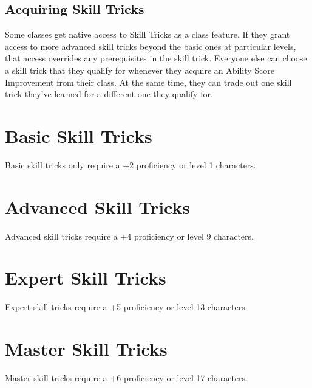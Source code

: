 \subsection{Acquiring Skill Tricks}
\label{subsec:acquiring-skill-tricks}

Some classes get native access to Skill Tricks as a class feature. If they grant access to more advanced skill tricks beyond the basic ones at particular levels, that access overrides any prerequisites in the skill trick. Everyone else can choose a skill trick that they qualify for whenever they acquire an Ability Score Improvement from their class. At the same time, they can trade out one skill trick they've learned for a different one they qualify for.

\section{Basic Skill Tricks}
\label{sec:skill-tricks-basic}

Basic skill tricks only require a +2 proficiency or level 1 characters.

\section{Advanced Skill Tricks}
\label{sec:skill-tricks-advanced}

Advanced skill tricks require a +4 proficiency or level 9 characters. 

\section{Expert Skill Tricks}
\label{sec:skill-tricks-expert}

Expert skill tricks require a +5 proficiency or level 13 characters.

\section{Master Skill Tricks}
\label{sec:skill-tricks-master}

Master skill tricks require a +6 proficiency or level 17 characters.
